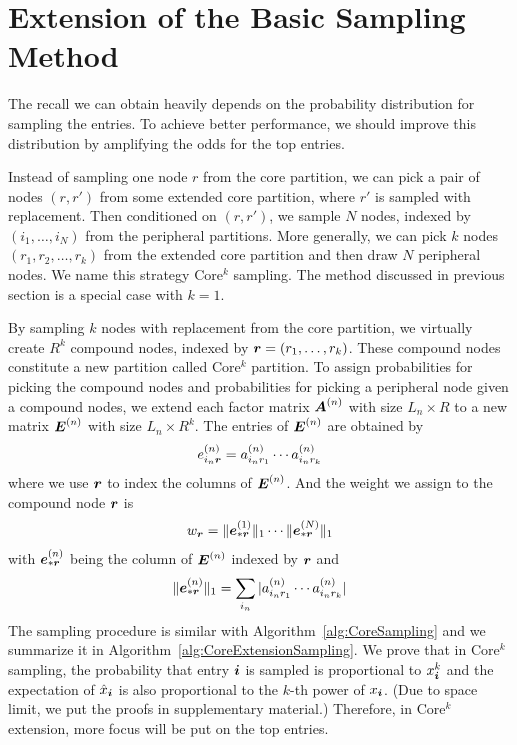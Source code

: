 \documentclass[letterpaper]{article}
\newcommand{\Sca}[3]{{#1}^{(#2)}_{i_#2#3}}%
\newcommand{\anr}[2]{\Sca{a}{#1}{#2}}
\newcommand{\enr}[2]{\Sca{e}{#1}{\V{#2}}}
\newcommand{\V}[1]{{\boldsymbol{{\MakeLowercase{#1}}}}}
\newcommand{\ColVec}[3]{\V{#1}^{(#2)}_{#3}}
\newcommand{\NormColE}[2]{\norm{\ColVec{e}{#1}{*\V{#2}}}{1}}
\newcommand{\predx}{\hat{x}_{\V{i}}}
\newcommand{\M}[1]{{\boldsymbol{{\MakeUppercase{#1}}}}}
\newcommand{\FacMat}[2]{\M{#1}^{(#2)}}
\newcommand{\norm}[2]{\|#1\|_{#2}}
\newcommand{\Alg}[1]{Algorithm~\ref{alg:#1}}
\begin{document}
\section{Extension of the Basic Sampling Method}
The recall we can obtain heavily depends on 
the probability distribution for sampling the entries. 
To achieve better performance, 
we should improve this distribution by amplifying the odds for the top entries.

Instead of sampling one node $r$ from the core partition, 
we can pick a pair of nodes $(r,r')$ from some extended core partition, 
where $r'$ is sampled with replacement. 
Then conditioned on $(r,r')$, we sample $N$ nodes, 
indexed by $(i_1,\ldots,i_N)$ from the peripheral partitions. 
More generally, we can pick $k$ nodes $(r_1,r_2,\ldots,r_k)$ from the extended core partition 
and then draw $N$ peripheral nodes. 
We name this strategy Core$^k$ sampling. 
The method discussed in previous section is a special case with $k=1$.

By sampling $k$ nodes with replacement from the core partition, 
we virtually create $R^k$ compound nodes, 
indexed by $\V{r}=(r_1,\ldots,r_k)$. 
These compound nodes constitute a new partition called Core$^k$ partition. 
To assign probabilities for picking the compound nodes and probabilities for picking a peripheral node given a compound nodes, 
we extend each factor matrix $\FacMat{A}{n}$ with size $L_n\times R$ to a new matrix $\M{E}^{(n)}$ with size $L_n\times R^k$. 
The entries of $\M{E}^{(n)}$ are obtained by
\begin{align}
\enr{n}{r} = \anr{n}{r_1}\cdots\anr{n}{r_k}
\end{align}
where we use $\V{r}$ to index the columns of $\M{E}^{(n)}$. And the weight we assign to the compound node $\V{r}$ is
\begin{align}
w_{\V{r}} = \NormColE{1}{r}\cdots\NormColE{N}{r}
\end{align}
with $\V{e}_{*\V{r}}^{(n)}$ being the column of $\M{E}^{(n)}$ indexed by $\V{r}$ and
\begin{align}
\NormColE{n}{r} = \sum_{i_n}|\anr{n}{r_1}\cdots\anr{n}{r_k}|
\end{align}
The sampling procedure is similar with \Alg{CoreSampling} 
and we summarize it in \Alg{CoreExtensionSampling}. 
We prove that in Core$^k$ sampling,
the probability that entry $\V{i}$ is sampled is proportional to $x_{\V{i}}^k$
and the expectation of $\predx$ is also proportional to the $k$-th power of $x_{\V{i}}$.
(Due to space limit, we put the proofs in supplementary material.)
Therefore, in Core$^k$ extension, more focus will be put on the top entries.
\end{document}
